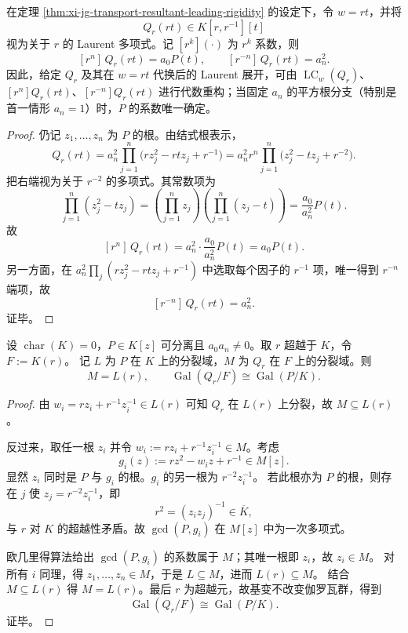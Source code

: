 \begin{theorem}\label{thm:xi-jg-holographic-coefficient-extraction}
在定理 \ref{thm:xi-jg-transport-resultant-leading-rigidity} 的设定下，令 \(w=r t\)，并将
\[
Q_r(r t)\in K[r,r^{-1}][t]
\]
视为关于 \(r\) 的 Laurent 多项式。记 \([r^k](\cdot)\) 为 \(r^k\) 系数，则
\[
[r^n]\,Q_r(r t)=a_0 P(t),\qquad
[r^{-n}]\,Q_r(r t)=a_n^2.
\]
因此，给定 \(Q_r\) 及其在 \(w=r t\) 代换后的 Laurent 展开，可由
\(\operatorname{LC}_w(Q_r)\)、\([r^n]Q_r(r t)\)、\([r^{-n}]Q_r(r t)\) 进行代数重构；当固定 \(a_n\) 的平方根分支（特别是首一情形 \(a_n=1\)）时，\(P\) 的系数唯一确定。
\end{theorem}
\begin{proof}
仍记 \(z_1,\dots,z_n\) 为 \(P\) 的根。由结式根表示，
\[
Q_r(r t)
=a_n^2\prod_{j=1}^n\bigl(r z_j^2-r t z_j+r^{-1}\bigr)
=a_n^2 r^n\prod_{j=1}^n\bigl(z_j^2-t z_j+r^{-2}\bigr).
\]
把右端视为关于 \(r^{-2}\) 的多项式。其常数项为
\[
\prod_{j=1}^n(z_j^2-t z_j)
=\left(\prod_{j=1}^n z_j\right)\!\left(\prod_{j=1}^n (z_j-t)\right)
=\frac{a_0}{a_n^2}P(t).
\]
故
\[
[r^n]\,Q_r(r t)=a_n^2\cdot \frac{a_0}{a_n^2}P(t)=a_0 P(t).
\]
另一方面，在
\(
a_n^2\prod_j(r z_j^2-r t z_j+r^{-1})
\)
中选取每个因子的 \(r^{-1}\) 项，唯一得到 \(r^{-n}\) 端项，故
\[
[r^{-n}]\,Q_r(r t)=a_n^2.
\]
证毕。
\end{proof}

\begin{theorem}[超越尺度下的伽罗瓦全信息保持]\label{thm:xi-jg-transcendental-scale-galois-full-fidelity}
设 \(\operatorname{char}(K)=0\)，\(P\in K[z]\) 可分离且 \(a_0 a_n\neq 0\)。取 \(r\) 超越于 \(K\)，令 \(F:=K(r)\)。
记 \(L\) 为 \(P\) 在 \(K\) 上的分裂域，\(M\) 为 \(Q_r\) 在 \(F\) 上的分裂域。则
\[
M=L(r),\qquad
\operatorname{Gal}(Q_r/F)\cong \operatorname{Gal}(P/K).
\]
\end{theorem}
\begin{proof}
由 \(w_i=r z_i+r^{-1}z_i^{-1}\in L(r)\) 可知 \(Q_r\) 在 \(L(r)\) 上分裂，故 \(M\subseteq L(r)\)。

反过来，取任一根 \(z_i\) 并令 \(w_i:=r z_i+r^{-1}z_i^{-1}\in M\)。考虑
\[
g_i(z):=r z^2-w_i z+r^{-1}\in M[z].
\]
显然 \(z_i\) 同时是 \(P\) 与 \(g_i\) 的根。\(g_i\) 的另一根为 \(r^{-2}z_i^{-1}\)。
若此根亦为 \(P\) 的根，则存在 \(j\) 使 \(z_j=r^{-2}z_i^{-1}\)，即
\[
r^2=(z_i z_j)^{-1}\in \overline K,
\]
与 \(r\) 对 \(K\) 的超越性矛盾。故 \(\gcd(P,g_i)\) 在 \(M[z]\) 中为一次多项式。

欧几里得算法给出 \(\gcd(P,g_i)\) 的系数属于 \(M\)；其唯一根即 \(z_i\)，故 \(z_i\in M\)。
对所有 \(i\) 同理，得 \(z_1,\dots,z_n\in M\)，于是 \(L\subseteq M\)，进而 \(L(r)\subseteq M\)。
结合 \(M\subseteq L(r)\) 得 \(M=L(r)\)。最后 \(r\) 为超越元，故基变不改变伽罗瓦群，得到
\[
\operatorname{Gal}(Q_r/F)\cong \operatorname{Gal}(P/K).
\]
证毕。
\end{proof}

